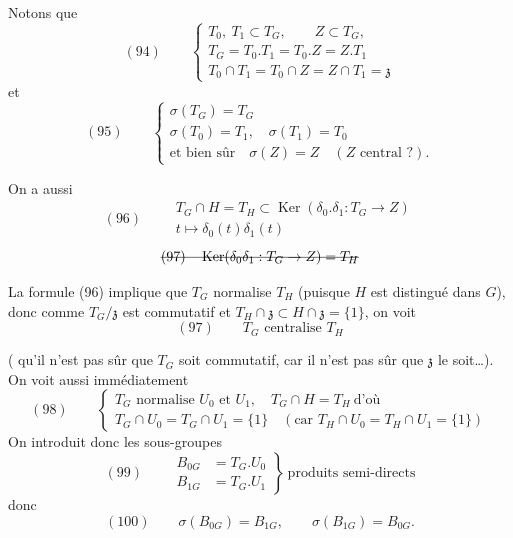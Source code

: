 \documentclass[11pt,a4paper]{article}
\begin{document}
Notons que
\[
(94)\qquad
\begin{cases}
T_0,\ T_1 \subset T_G, \qquad Z\subset T_G ,\\
T_G = T_0.T_1 = T_0.Z = Z.T_1\\
T_0\cap T_1 = T_0\cap Z = Z\cap T_1 = \mathfrak{z}
\end{cases}
\]
et
\[
(95)\qquad
\begin{cases}
\sigma(T_G) = T_G\\
\sigma(T_0) = T_1, \quad \sigma(T_1) = T_0\\
\text{et bien sûr}\quad \sigma(Z) = Z \quad (Z \text{ central ?}) .
\end{cases}
\]

On a aussi
\[
(96)\qquad
\begin{gathered}
T_G\cap H = T_H \subset \operatorname{Ker}(\delta_0.\delta_1 : T_G\to Z)\\
t \longmapsto \delta_0(t)\delta_1(t)
\end{gathered}
\]
 
\[
\text{\struck{$(97)\quad \operatorname{Ker}(\delta_0\delta_1 : T_G\to Z) = T_H$}}
\]
 

La formule (96) implique que $T_G$ normalise $T_H$ (puisque $H$ est distingué dans $G$), donc
comme $T_G/\mathfrak{z}$ est commutatif et $T_H\cap\mathfrak{z}\subset H\cap\mathfrak{z} = \{1\}$, on voit
\[
(97)\qquad T_G \text{ centralise } T_H
\]


( qu'il n'est pas sûr que $T_G$ soit commutatif, car il n'est pas sûr que
$\mathfrak{z}$ le soit…). On voit aussi immédiatement
\[
(98)\qquad
\begin{cases}
T_G \text{ normalise } U_0 \text{ et } U_1, \quad T_G\cap H = T_H \ \text{d'où}\\
T_G\cap U_0 = T_G\cap U_1 = \{1\} \quad (\text{car } T_H\cap U_0 = T_H\cap U_1 = \{1\})
\end{cases}
\]
On introduit donc les sous-groupes
\[
(99)\qquad
\left.
\begin{aligned}
B_{0G} &= T_G.U_0\\
B_{1G} &= T_G.U_1
\end{aligned}
\right\}\ \text{produits semi-directs}
\]
donc
\[
(100)\qquad \sigma(B_{0G}) = B_{1G}, \qquad \sigma(B_{1G}) = B_{0G} .
\]
\end{document}
